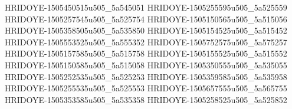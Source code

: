 HRIDOYE-1505450515u505_5a545051
HRIDOYE-1505255595u505_5a525559
HRIDOYE-1505257545u505_5a525754
HRIDOYE-1505150565u505_5a515056
HRIDOYE-1505358505u505_5a535850
HRIDOYE-1505154525u505_5a515452
HRIDOYE-1505553525u505_5a555352
HRIDOYE-1505752575u505_5a575257
HRIDOYE-1505157585u505_5a515758
HRIDOYE-1505155525u505_5a515552
HRIDOYE-1505150585u505_5a515058
HRIDOYE-1505350555u505_5a535055
HRIDOYE-1505252535u505_5a525253
HRIDOYE-1505359585u505_5a535958
HRIDOYE-1505255535u505_5a525553
HRIDOYE-1505657555u505_5a565755
HRIDOYE-1505353585u505_5a535358
HRIDOYE-1505258525u505_5a525852

